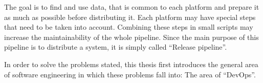The goal is to find and use data, that is common to each platform and prepare it as much as possible before distributing it.
Each platform may have special steps that need to be taken into account.
Combining these steps in small scripts may increase the maintainability of the whole pipeline.
Since the main purpose of this pipeline is to distribute a system, it is simply called ``Release pipeline''.

In order to solve the problems stated, this thesis first introduces the general area of software engineering in which these problems fall into: The area of ``DevOps''.
